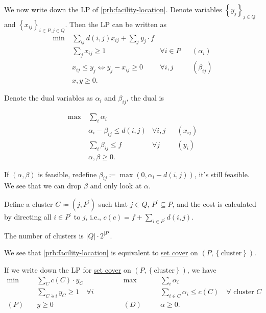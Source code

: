 We now write down the LP of \autoref{prb:facility-location}. Denote variables \(\left\{ y_{j} \right\}_{j\in Q}\) and \(\left\{ x_{ij} \right\}_{i\in P, j\in Q}\). Then the LP can be written as
\begin{align*}
	\min~ & \sum_{ij} d(i, j) x_{ij} + \sum_{j} y_{j} \cdot f                                     \\
	      & \sum_{j}x_{ij} \geq 1                             & \forall i\in P &  & (\alpha _i)   \\
	      & x_{ij} \leq y_j \iff y_j - x_{ij} \geq 0          & \forall i, j   &  & (\beta_{ij} ) \\
	      & x, y \geq 0.
\end{align*}

Denote the dual variables as \(\alpha _i\) and \(\beta_{ij} \), the dual is

\begin{align*}
	\max~ & \sum_{i} \alpha _i                                                 \\
	      & \alpha _i - \beta _{ij} \leq d(i, j) & \forall i, j &  & (x_{ij} ) \\
	      & \sum_{i} \beta _{ij} \leq f          & \forall j    &  & (y_i)     \\
	      & \alpha , \beta \geq 0.
\end{align*}

\begin{remark}
	If \((\alpha , \beta )\) is feasible, redefine \(\beta _{ij} \coloneqq \max (0, \alpha _i - d(i, j))\), it's still feasible. We see that we can drop \(\beta\) and only look at \(\alpha \).
\end{remark}


Define a cluster \(C \coloneqq (j, P^\prime )\) such that \(j\in Q\), \(P^\prime \subseteq P\), and the cost is calculated by directing all \(i\in P^\prime \) to \(j\), i.e., \(c(c) = f + \sum_{i\in P^\prime }d(i, j)\).

\begin{note}
	The number of clusters is \(\left\vert Q \right\vert \cdot 2^{\left\vert P \right\vert }\).
\end{note}

\begin{remark}
	We see that \autoref{prb:facility-location} is equivalent to \hyperref[prb:set-cover]{set cover} on \((P, \left\{ \text{cluster} \right\} )\).
\end{remark}
\begin{explanation}
	If we write down the LP for \hyperref[prb:set-cover]{set cover} on \((P, \left\{ \text{cluster} \right\} )\), we have
	\[
		\begin{alignedat}{5}
			\min~&\sum_{C} c(C)\cdot y_C\qquad\qquad&&\max ~&&\sum_{i}\alpha _i\\
			& \sum_{C\ni i}y_C  \geq 1 \quad \forall i 				&&		&&\sum_{i\in C} \alpha _{i} \leq c(C)\quad \forall \text{ cluster }C \\
			(P)\quad	&y\geq  0 	&&(D)\quad&& \alpha \geq 0.
		\end{alignedat}
	\]
\end{explanation}


